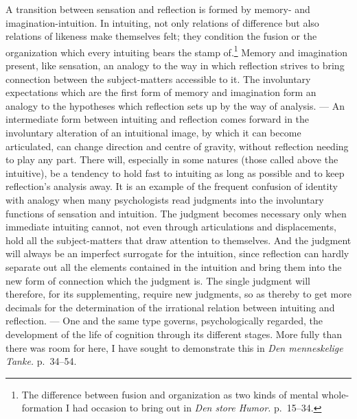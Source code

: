 \documentclass[12pt]{book}
\newcommand{\opage}[1]{\marginnote{\footnotesize\textit{[#1]}}}
\begin{document}
A transition between sen\-sa\-tion and re\-flec\-tion is formed by mem\-o\-ry- and
imag\-i\-na\-tion-intuition. In intuiting, not only relations of difference but also
relations of likeness make themselves felt; they condition the fusion or the
organization which every intuiting bears the stamp of.\footnote{The difference
between fusion and organization as two kinds of mental whole-formation I had
occasion to bring out in \textit{Den store Humor.} p.\ 15--34.} Memory and
\opage{63}imagination present, like sensation, an analogy to the way in which reflection
strives to bring connection between the subject-matters accessible to it. The
involuntary expectations which are the first form of memory and imagination form
an analogy to the hypotheses which reflection sets up by the way of analysis. ---
An intermediate form between intuiting and reflection comes forward in the
involuntary alteration of an intuitional image, by which it can become
articulated, can change direction and centre of gravity, without reflection
needing to play any part. There will, especially in some natures (those called
above the intuitive), be a tendency to hold fast to intuiting as long as
possible and to keep reflection's analysis away. It is an example of the frequent
confusion of identity with analogy when many psychologists read judgments into
the involuntary functions of sensation and intuition. The judgment becomes
necessary only when immediate intuiting cannot, not even through articulations
and displacements, hold all the subject-matters that draw attention to
themselves. And the judgment will always be an imperfect surrogate for the
intuition, since reflection can hardly separate out all the elements contained in
the intuition and bring them into the new form of connection which the judgment
is. The single judgment will therefore, for its supplementing, require new
judgments, so as thereby to get more decimals for the determination of the
irrational relation between intuiting and reflection. --- One and the same type
governs, psychologically regarded, the development of the life of cognition
through its different stages. More fully than there was room for here, I have
sought to demonstrate this in \textit{Den menneskelige Tanke.} p.\ 34--54.
\end{document}
